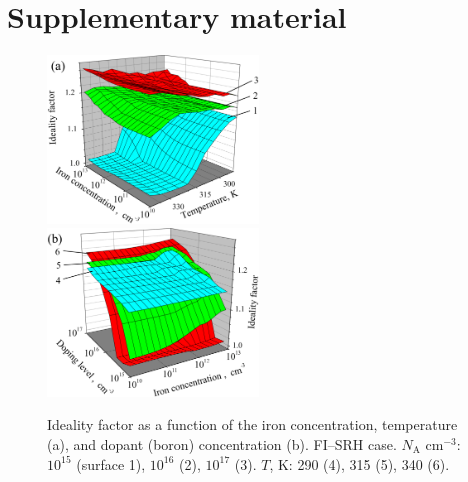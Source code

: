 \documentclass [sort&compress] {elsarticle}
\begin{document}
\section*{Supplementary material}


\begin{figure}[!h]
\includegraphics[width=0.5\textwidth]{FigS1a}%
\includegraphics[width=0.5\textwidth]{FigS1b}
\caption{\label{figS1}
Ideality factor as a function of the iron concentration, temperature (a), and dopant (boron) concentration (b).
FI--SRH case.
$N_\mathrm{A}$ cm$^{-3}$: $10^{15}$ (surface 1), $10^{16}$ (2), $10^{17}$ (3).
$T$, K: 290 (4), 315 (5), 340 (6).
}%
\end{figure}
\end{document}
